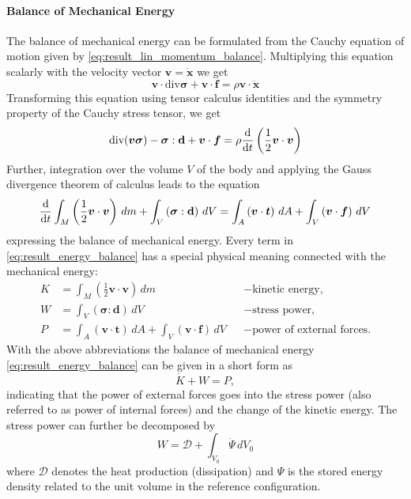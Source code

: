 \paragraph*{Balance of Mechanical Energy}
The balance of mechanical energy can be formulated from the Cauchy equation of motion given by \cref{eq:result_lin_momentum_balance}. Multiplying this equation scalarly with the velocity vector \(\bm{v} = \dot{\bm{x}}\) we get
\begin{equation}
    \bm{v} \cdot \text{div}\bm{\sigma} + \bm{v} \cdot \bm{f} 
    = \rho\bm{v} \cdot \ddot{\bm{x}}
\end{equation}
Transforming this equation using tensor calculus identities and the symmetry property of the Cauchy stress tensor, we get
\begin{equation}
    \text{div}(\bm{v\sigma}) - \bm{\sigma} : \mathbf{d} 
    + \bm{v} \cdot \bm{f} 
    = \rho\odv*{\left(\frac{1}{2}\bm{v} \cdot \bm{v}\right)}{t}
\end{equation}
Further, integration over the volume \(V\) of the body and applying the Gauss divergence theorem of calculus leads to the equation
\begin{equation}
    \odv*{\int_{M}^{}\left(\frac{1}{2}\bm{v} \cdot \bm{v}\right) \, dm}{t}
     + \int_{V}^{}\left(\bm{\sigma} : \mathbf{d}\right) \, dV
     = \int_{A}^{}\left(\bm{v} \cdot \bm{t}\right) \, dA
     + \int_{V}^{}\left(\bm{v} \cdot \bm{f}\right) \, dV
    \label{eq:result_energy_balance}
\end{equation}
expressing the balance of mechanical energy. Every term in \cref{eq:result_energy_balance} has a special physical meaning connected with the mechanical energy:
\begin{align}
    K &= \int_{M}^{}\left(\frac{1}{2}\bm{v} \cdot \bm{v}\right) \, dm
    && - \text{kinetic energy,} \\
    W &= \int_{V}^{}\left(\bm{\sigma} : \mathbf{d}\right) \, dV 
    && - \text{stress power,} \label{eq:stress_power}\\
    P &= \int_{A}^{}\left(\bm{v} \cdot \bm{t}\right) \, dA
    + \int_{V}^{}\left(\bm{v} \cdot \bm{f}\right) \, dV
    && - \text{power of external forces.} 
\end{align}
With the above abbreviations the balance of mechanical energy \cref{eq:result_energy_balance} can be given in a short form as
\begin{equation}
    \dot{K} + W = P,
\end{equation}
indicating that the power of external forces goes into the stress power (also referred to as power of internal forces) and the change of the kinetic energy.
The stress power can further be decomposed by 
\begin{equation}
    W = \mathcal{D} + \int_{V_{0}}^{} \dot{\Psi } \, dV_{0}
    \label{eq:stress_power_dissipation}
\end{equation}
where \(\mathcal{D}\) denotes the heat production (dissipation) and \(\Psi\) is the stored energy density related to the unit volume in the reference configuration.

